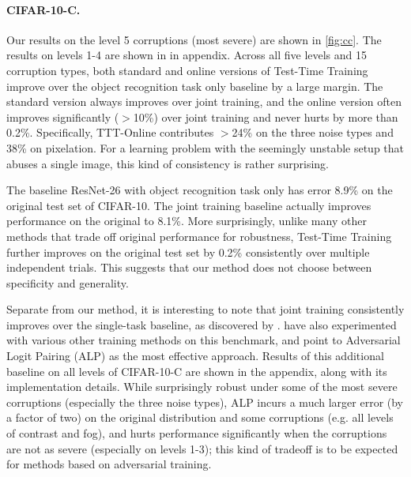 \documentclass{article}
\theoremstyle{plain}
\theoremstyle{remark}
\theoremstyle{definition}
\begin{document}
\paragraph{CIFAR-10-C.}
Our results on the level 5 corruptions (most severe) are shown in \autoref{fig:cc}.
The results on levels 1-4 are shown in
 in appendix. 
Across all five levels and 15 corruption types, both standard and online versions of Test-Time Training improve over the object recognition task only baseline by a large margin. 
The standard version always improves over joint training, and the online version often improves significantly ($>$10\%) over joint training and never hurts by more than 0.2\%. 
Specifically, TTT-Online contributes $>$24\% on the three noise types and 38\% on pixelation. 
For a learning problem with the seemingly unstable setup that abuses a single image, this kind of consistency is rather surprising.

The baseline ResNet-26 with object recognition task only has error 8.9\% on the original test set of CIFAR-10. The joint training baseline actually improves performance on the original to 8.1\%. More surprisingly, unlike many other methods that trade off original performance for robustness, Test-Time Training further improves on the original test set by 0.2\% consistently over multiple independent trials. This suggests that our method does not choose between specificity and generality.

\newpage
Separate from our method, it is interesting to note that joint training consistently improves over the single-task baseline, as discovered by \citet{hendrycks2019using}.
\citet{hendrycks2019benchmarking} have also experimented with various other training methods on this benchmark, and point to Adversarial Logit Pairing (ALP) \citep{kannan2018adversarial} as the most effective approach. 
Results of this additional baseline on all levels of CIFAR-10-C are shown in the appendix, along with its implementation details. While surprisingly robust under some of the most severe corruptions (especially the three noise types), ALP incurs a much larger error (by a factor of two) on the original distribution and some corruptions (e.g. all levels of contrast and fog), and hurts performance significantly when the corruptions are not as severe (especially on levels 1-3); 
this kind of tradeoff is to be expected for methods based on adversarial training.
\end{document}
